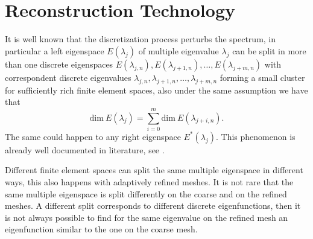 \documentclass[smallextended]{svjour3}
\begin{document}
 



\section{Reconstruction Technology}\label{sec:reco}

It is well known that the discretization process perturbs the spectrum, in particular a left eigenspace $E(\lambda_j)$ of multiple eigenvalue $\lambda_j$ can be split in more than one discrete eigenspaces $E(\lambda_{j,n}),E(\lambda_{j+1,n}),\dots,E(\lambda_{j+m,n})$ with correspondent discrete eigenvalues $\lambda_{j,n},\lambda_{j+1,n},\dots,\lambda_{j+m,n}$ forming a small cluster for sufficiently rich finite element spaces, also under the same assumption we have that
$$
\mathrm{dim}\ E(\lambda_j)=\sum_{i=0}^m\mathrm{dim}\ E(\lambda_{j+i,n}).
$$
The same could happen to any right eigenspace $E^*(\lambda_j)$.
This phenomenon is already well documented in literature,  see \cite{strang,babuska,hackbusch}.

Different finite element spaces can split the same multiple eigenspace in different ways, this also happens with adaptively refined meshes. It is not rare that the same multiple eigenspace is split differently on the coarse and on the refined meshes. A different split corresponds to different discrete eigenfunctions, then it is not always possible to find for the same eigenvalue on the refined mesh an eigenfunction similar to the one on the coarse mesh.
\end{document}
